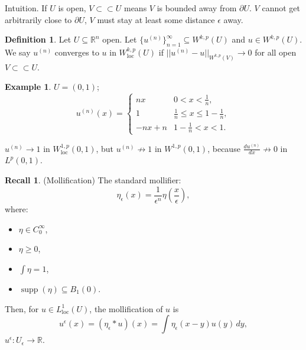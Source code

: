 \documentclass[12pt]{article}
\DeclareMathOperator{\supp}{supp}
\theoremstyle{definition}
\newtheorem*{definition*}{Definition}
\newtheorem*{recall}{Recall}
\newtheorem*{example*}{Example}
\begin{document}
Intuition. If $U$ is open, $V\subset\subset U$ means $V$ is bounded away from $\partial U$. $V$ cannot get arbitrarily close to $\partial U$, $V$ must stay at least some distance $\epsilon$ away.

\begin{definition*}
Let $U\subseteq\mathbb R^n$ open. Let $\{u^{(n)}\}_{n=1}^\infty\subseteq W^{k,p}(U)$ and $u\in W^{k,p}(U)$. We say $u^{(n)}$ converges to $u$ in $W_\text{loc}^{k,p}(U)$ if $||u^{(n)}-u||_{W^{k,p}(V)}\rightarrow0$ for all open $V\subset\subset U$.
\end{definition*}

\begin{example*}
$U=(0,1)$;
\[u^{(n)}(x)=\left\{\begin{array}{ll}nx&0<x<\frac1n,\\1&\frac1n\leq x\leq1-\frac1n,\\-nx+n&1-\frac1n<x<1.\end{array}\right.\]

\begin{center}
\end{center}

$u^{(n)}\rightarrow1$ in $W_\text{loc}^{1,p}(0,1)$, but $u^{(n)}\not\rightarrow1$ in $W^{1,p}(0,1)$, because $\frac{du^{(n)}}{dx}\not\rightarrow0$ in $L^p(0,1)$.
\end{example*}

\begin{recall}
(Mollification) The standard mollifier:
\[\eta_\epsilon(x)=\frac1{\epsilon^n}\eta\left(\frac x\epsilon\right),\]
where:
\begin{itemize}
\item $\eta\in C_0^\infty$,
\item $\eta\geq0$,
\item $\int\eta=1$,
\item $\supp(\eta)\subseteq B_1(0)$.
\end{itemize}

Then, for $u\in L_\text{loc}^1(U)$, the mollification of $u$ is
\[u^\epsilon(x)=(\eta_\epsilon*u)(x)=\int\eta_\epsilon(x-y)u(y)\,dy,\]
$u^\epsilon:U_\epsilon\rightarrow\mathbb R$.
\end{recall}
\end{document}

